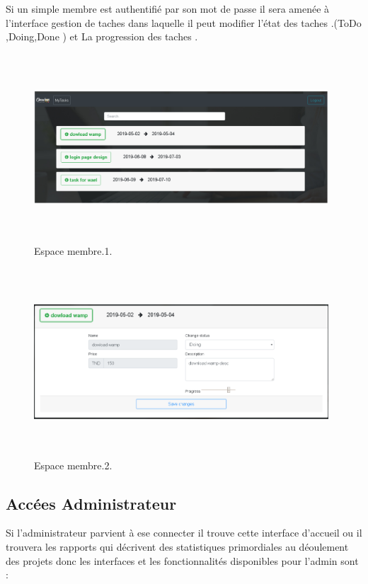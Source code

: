 Si un simple membre est authentifi\'{e} par son mot de passe il sera amen\'{e}e \`{a}
l'interface \guillemotleft{} gestion de taches \guillemotright{} dans laquelle il peut modifier l'\'{e}tat des
taches .(ToDo ,Doing,Done ) et La progression des taches .

\FloatBarrier
\begin{figure}[H]
\center
\includegraphics[width=11cm,height=7cm]{./figures/pres/2.png}
\caption{Espace membre.1.}

\end{figure}
\FloatBarrier

\FloatBarrier
\begin{figure}[H]
\center
\includegraphics[width=11cm,height=7cm]{./figures/pres/3.png}
\caption{Espace membre.2.}

\end{figure}
\FloatBarrier
\subsection{Acc\'{e}es Administrateur}

Si l'administrateur parvient \`{a} ese connecter il trouve cette interface d'accueil
ou il trouvera les rapports qui d\'{e}crivent des statistiques primordiales au
d\'{e}oulement des projets donc les interfaces et les fonctionnalit\'{e}s disponibles
pour l'admin sont :

